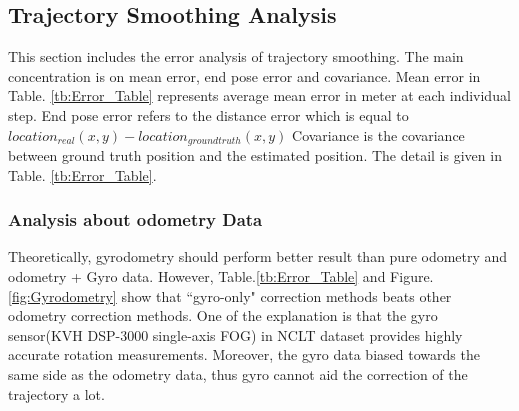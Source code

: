 \subsection{Trajectory Smoothing Analysis}
This section includes the error analysis of trajectory smoothing. The main concentration is on mean error,  end pose error and covariance. Mean error in Table. \ref{tb:Error_Table} represents average mean error in meter at each individual step. End pose error refers to the distance error which is equal to $location_{real}(x,y) - location_{ground truth}(x,y)$ Covariance is the covariance between ground truth position and the estimated position. The detail is given in Table. \ref{tb:Error_Table}.

\begin{table}[h]
	\captionsetup[table]{position=here}
    \caption{\label{tb:Error_Table}
    Error Analysis using Trajectory smoothing
    } 
    \begin{center}
    \end{center}
\end{table}

\subsubsection{Analysis about odometry Data}
Theoretically, gyrodometry should perform better result than pure odometry and odometry + Gyro data. However, Table.\ref{tb:Error_Table} and Figure.\ref{fig:Gyrodometry} show that ``gyro-only" correction methods beats other odometry correction methods. One of the explanation is that the gyro sensor(KVH DSP-3000 single-axis FOG) in NCLT dataset provides highly accurate rotation measurements. Moreover, the gyro data  biased towards the same side as the odometry data, thus gyro cannot aid the correction of the trajectory a lot.

